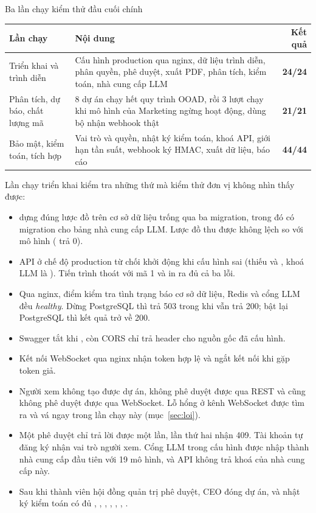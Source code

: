 \begin{table}{Ba lần chạy kiểm thử đầu cuối chính}
\label{tab:e2e}
\small
\begin{tabularx}{\textwidth}{|P{3.4cm}|L|r|}
\hline
\textbf{Lần chạy} & \textbf{Nội dung} & \textbf{Kết quả} \\ \hline
Triển khai và trình diễn & Cấu hình production qua nginx, dữ liệu trình diễn, phân quyền, phê duyệt, xuất PDF, phân tích, kiểm toán, nhà cung cấp LLM & \textbf{24/24} \\ \hline
Phân tích, dự báo, chất lượng mã & 8 dự án chạy hết quy trình OOAD, rồi 3 lượt chạy khi mô hình của Marketing ngừng hoạt động, dùng bộ nhận webhook thật & \textbf{21/21} \\ \hline
Bảo mật, kiểm toán, tích hợp & Vai trò và quyền, nhật ký kiểm toán, khoá API, giới hạn tần suất, webhook ký HMAC, xuất dữ liệu, báo cáo & \textbf{44/44} \\ \hline
\end{tabularx}
\end{table}

Lần chạy triển khai kiểm tra những thứ mà kiểm thử đơn vị không nhìn thấy được:

\begin{itemize}
\item {} dựng đúng lược đồ trên cơ sở dữ liệu trống qua ba migration, trong đó có migration cho bảng nhà cung cấp LLM. Lược đồ thu được không lệch so với mô hình ( trả 0).
\item API ở chế độ production từ chối khởi động khi cấu hình sai (thiếu  và , khoá LLM là ). Tiến trình thoát với mã 1 và in ra đủ cả ba lỗi.
\item Qua nginx, điểm kiểm tra tình trạng báo cơ sở dữ liệu, Redis và cổng LLM đều \textit{healthy}. Dừng PostgreSQL thì  trả 503 trong khi  vẫn trả 200; bật lại PostgreSQL thì kết quả trở về 200.
\item Swagger tắt khi , còn CORS chỉ trả header cho nguồn gốc đã cấu hình.
\item Kết nối WebSocket qua nginx nhận token hợp lệ và ngắt kết nối khi gặp token giả.
\item Người xem không tạo được dự án, không phê duyệt được qua REST và cũng không phê duyệt được qua WebSocket. Lỗ hổng ở kênh WebSocket được tìm ra và vá ngay trong lần chạy này (mục~\ref{sec:loi}).
\item Một phê duyệt chỉ trả lời được một lần, lần thứ hai nhận 409. Tài khoản tự đăng ký nhận vai trò người xem. Cổng LLM trong cấu hình được nhập thành nhà cung cấp đầu tiên với 19 mô hình, và API không trả khoá của nhà cung cấp này.
\item Sau khi thành viên hội đồng quản trị phê duyệt, CEO đóng dự án, và nhật ký kiểm toán có đủ , , , , , , .
\end{itemize}

